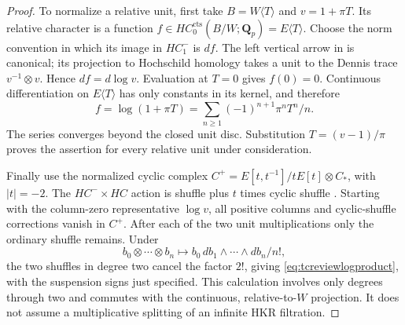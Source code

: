 \documentclass[11pt,a4paper]{article}
\theoremstyle{remark}
\begin{document}
\begin{proof}
To normalize a relative unit, first take $B=W\langle T\rangle$ and
$v=1+\pi T$. Its relative character is a function
$f\in HC_0^{\mathrm{cts}}(B/W;\mathbf Q_p)=E\langle T\rangle$.
Choose the norm convention in which its image in $HC^-_1$ is $df$.
The left vertical arrow in \cite[Theorem~2.12]{AMMN} is canonical;
its projection to Hochschild homology takes a unit to the Dennis trace
$v^{-1}\otimes v$. Hence $df=d\log v$. Evaluation at $T=0$ gives
$f(0)=0$. Continuous differentiation on $E\langle T\rangle$ has
only constants in its kernel, and therefore
\[
 f=\log(1+\pi T)=\sum_{n\ge1}(-1)^{n+1}\pi^nT^n/n.
\]
The series converges beyond the closed unit disc. Substitution
$T=(v-1)/\pi$ proves the assertion for every relative unit under
consideration.

Finally use the normalized cyclic complex
$C^+=E[t,t^{-1}]/tE[t]\otimes C_*$, with $|t|=-2$.
The $HC^-\times HC$ action is shuffle plus $t$ times cyclic shuffle
\cite[Definition~2.1 and Remark~2.2]{BokstedtOttosen}.
Starting with the column-zero representative $\log v$, all positive
columns and cyclic-shuffle corrections vanish in $C^+$. After each
of the two unit multiplications only the ordinary shuffle remains.
Under
\[
 b_0\otimes\cdots\otimes b_n\longmapsto
       b_0\,db_1\wedge\cdots\wedge db_n/n!,
\]
the two shuffles in degree two cancel the factor $2!$, giving
\eqref{eq:tcreviewlogproduct}, with the suspension signs just specified.
This calculation involves only degrees through two and commutes with
the continuous, relative-to-$W$ projection. It does not assume a
multiplicative splitting of an infinite HKR filtration.
\end{proof}
\end{document}
